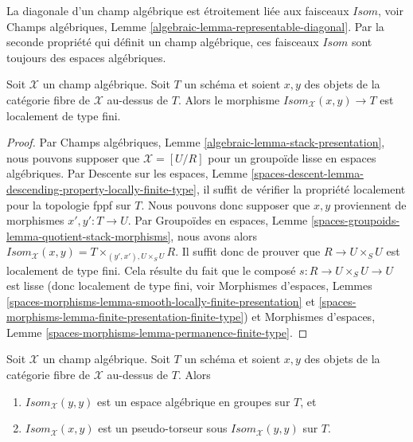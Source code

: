\noindent
La diagonale d'un champ algébrique est étroitement liée aux faisceaux
$\mathit{Isom}$, voir
Champs algébriques, Lemme \ref{algebraic-lemma-representable-diagonal}.
Par la seconde propriété qui définit un champ algébrique, ces faisceaux
$\mathit{Isom}$ sont toujours des espaces algébriques.

\begin{lemma}
\label{lemma-isom-locally-finite-type}
Soit $\mathcal{X}$ un champ algébrique.
Soit $T$ un schéma et soient $x,y$ des objets de la catégorie fibre de
$\mathcal{X}$ au-dessus de $T$. Alors le morphisme
$\mathit{Isom}_\mathcal{X}(x,y) \to T$ est localement de type fini.
\end{lemma}

\begin{proof}
Par Champs algébriques, Lemme
\ref{algebraic-lemma-stack-presentation}, nous pouvons supposer que
$\mathcal{X}=[U/R]$ pour un groupoïde lisse en espaces algébriques.
Par Descente sur les espaces,
Lemme \ref{spaces-descent-lemma-descending-property-locally-finite-type},
il suffit de vérifier la propriété localement pour la topologie fppf sur $T$.
Nous pouvons donc supposer que $x,y$ proviennent de morphismes
$x',y':T\to U$. Par Groupoïdes en espaces,
Lemme \ref{spaces-groupoids-lemma-quotient-stack-morphisms}, nous avons alors
$\mathit{Isom}_\mathcal{X}(x,y)=T\times_{(y',x'),U\times_S U}R$.
Il suffit donc de prouver que $R\to U\times_S U$ est localement de type fini.
Cela résulte du fait que le composé
$s:R\to U\times_S U\to U$ est lisse (donc localement de type fini, voir
Morphismes d'espaces, Lemmes
\ref{spaces-morphisms-lemma-smooth-locally-finite-presentation} et
\ref{spaces-morphisms-lemma-finite-presentation-finite-type})
et Morphismes d'espaces, Lemme
\ref{spaces-morphisms-lemma-permanence-finite-type}.
\end{proof}

\begin{lemma}
\label{lemma-isom-pseudo-torsor-aut}
Soit $\mathcal{X}$ un champ algébrique.
Soit $T$ un schéma et soient $x,y$ des objets de la catégorie fibre de
$\mathcal{X}$ au-dessus de $T$. Alors
\begin{enumerate}
\item $\mathit{Isom}_\mathcal{X}(y,y)$ est un espace algébrique en groupes
sur $T$, et
\item $\mathit{Isom}_\mathcal{X}(x,y)$ est un pseudo-torseur sous
$\mathit{Isom}_\mathcal{X}(y,y)$ sur $T$.
\end{enumerate}
\end{lemma}

